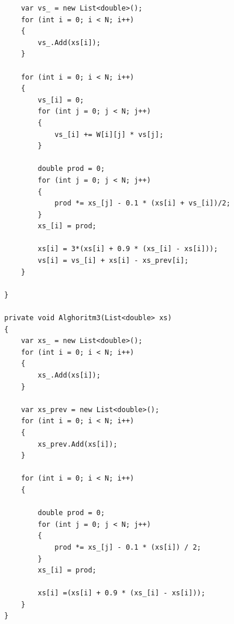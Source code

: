 \documentclass[a4paper]{article}
\begin{document}
\begin{verbatim}
            var vs_ = new List<double>();
            for (int i = 0; i < N; i++)
            {
                vs_.Add(xs[i]);
            }

            for (int i = 0; i < N; i++)
            {
                vs_[i] = 0;
                for (int j = 0; j < N; j++)
                {
                    vs_[i] += W[i][j] * vs[j];
                }

                double prod = 0;
                for (int j = 0; j < N; j++)
                {
                    prod *= xs_[j] - 0.1 * (xs[i] + vs_[i])/2;
                }
                xs_[i] = prod;

                xs[i] = 3*(xs[i] + 0.9 * (xs_[i] - xs[i]));
                vs[i] = vs_[i] + xs[i] - xs_prev[i];
            }

        }

        private void Alghoritm3(List<double> xs)
        {
            var xs_ = new List<double>();
            for (int i = 0; i < N; i++)
            {
                xs_.Add(xs[i]);
            }

            var xs_prev = new List<double>();
            for (int i = 0; i < N; i++)
            {
                xs_prev.Add(xs[i]);
            }

            for (int i = 0; i < N; i++)
            {

                double prod = 0;
                for (int j = 0; j < N; j++)
                {
                    prod *= xs_[j] - 0.1 * (xs[i]) / 2;
                }
                xs_[i] = prod;

                xs[i] =(xs[i] + 0.9 * (xs_[i] - xs[i]));
            }
        }


\end{verbatim}
\end{document}
